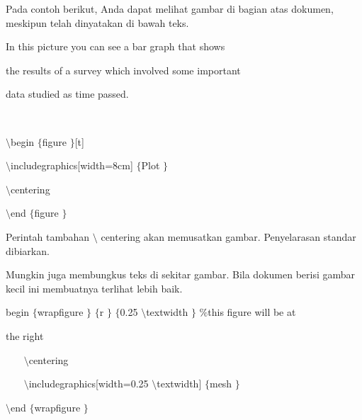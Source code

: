 Pada contoh berikut, Anda dapat melihat gambar di bagian atas dokumen, meskipun telah dinyatakan di bawah teks. \par
\vspace{14pt}
\noindent
In this picture you can see a bar graph that shows \par
\vspace{12pt}
\noindent
the results of a survey which involved some important \par
\vspace{12pt}
\noindent
data studied as time passed. \par
\noindent
 $  $ \par
\noindent
 $  \setminus $begin $  \{  $figure $  \}  $[t] \par
\vspace{12pt}
\noindent
 $  \setminus $includegraphics[width=8cm] $  \{  $Plot $  \}  $ \par
\vspace{12pt}
\noindent
 $  \setminus $centering \par
\vspace{12pt}
\noindent
 $  \setminus $end $  \{  $figure $  \}  $ \par
\vspace{18pt}
\vspace{18pt}
\noindent
Perintah tambahan  $  \setminus $ centering akan memusatkan gambar. Penyelarasan standar dibiarkan. \par
\noindent
Mungkin juga membungkus teks di sekitar gambar. Bila dokumen berisi gambar kecil ini membuatnya terlihat lebih baik. \par
\vspace{22pt}
\noindent
begin $  \{  $wrapfigure $  \}  $ $  \{  $r $  \}  $ $  \{  $0.25 $  \setminus $textwidth $  \}  $  $  \%  $this figure will be at  \par
\vspace{12pt}
\noindent
the right \par
\vspace{12pt}
\noindent
~~~  $  \setminus $centering \par
\vspace{12pt}
\noindent
~~~  $  \setminus $includegraphics[width=0.25 $  \setminus $textwidth] $  \{  $mesh $  \}  $ \par
\vspace{12pt}
\noindent
 $  \setminus $end $  \{  $wrapfigure $  \}  $ \par
\noindent
 $  $ \par
\noindent
